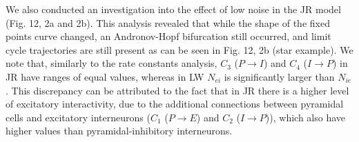 \documentclass[12pt,twoside]{article}
\begin{document}
We also conducted an investigation into the effect of low noise in the JR model (Fig. 12, 2a and 2b). This analysis revealed that while the shape of the fixed points curve changed, an Andronov-Hopf bifurcation still occurred, and limit cycle trajectories are still present as can be seen in Fig. 12, 2b (star example).
We note that, similarly to the rate constants analysis, $C_{3}$ ($P \rightarrow I$) and $C_{4}$ ($I \rightarrow P$) in JR have ranges of equal values, whereas in LW $N_{ei}$ is significantly larger than $N_{ie}$. This discrepancy can be attributed to the fact that in JR there is a higher level of excitatory interactivity, due to the additional connections between pyramidal cells and excitatory interneurons ($C_{1}$ ($P \rightarrow E$) and $C_{2}$ ($I \rightarrow P$)), which also have higher values than pyramidal-inhibitory interneurons. 
\end{document}
